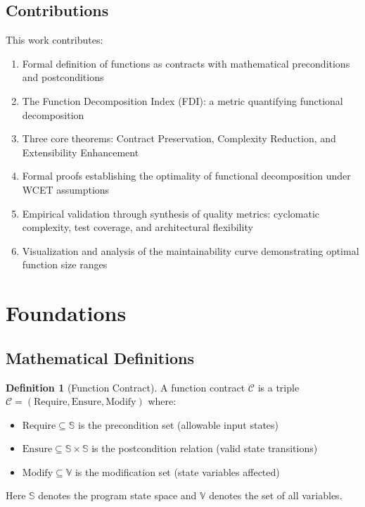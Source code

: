\documentclass[a4paper,12pt]{article}
\theoremstyle{definition}
\newtheorem{definition}{Definition}
\begin{document}
\subsection{Contributions}

This work contributes:

\begin{enumerate}
	\item Formal definition of functions as contracts with mathematical preconditions and postconditions
	\item The Function Decomposition Index (FDI): a metric quantifying functional decomposition
	\item Three core theorems: Contract Preservation, Complexity Reduction, and Extensibility Enhancement
	\item Formal proofs establishing the optimality of functional decomposition under WCET assumptions
	\item Empirical validation through synthesis of quality metrics: cyclomatic complexity, test coverage, and architectural flexibility
	\item Visualization and analysis of the maintainability curve demonstrating optimal function size ranges
\end{enumerate}

\section{Foundations}

\subsection{Mathematical Definitions}

\begin{definition}[Function Contract]
A function contract $\mathcal{C}$ is a triple $\mathcal{C} = (\mathrm{Require}, \mathrm{Ensure}, \mathrm{Modify})$ where:
\begin{itemize}
	\item $\mathrm{Require} \subseteq \mathbb{S}$ is the precondition set (allowable input states)
	\item $\mathrm{Ensure} \subseteq \mathbb{S} \times \mathbb{S}$ is the postcondition relation (valid state transitions)
	\item $\mathrm{Modify} \subseteq \mathbb{V}$ is the modification set (state variables affected)
\end{itemize}
Here $\mathbb{S}$ denotes the program state space and $\mathbb{V}$ denotes the set of all variables.
\end{definition}
\end{document}
